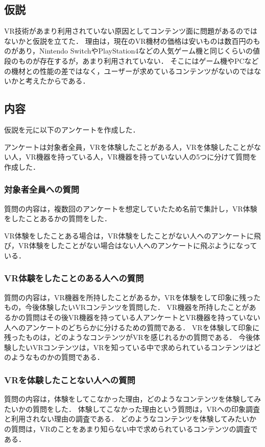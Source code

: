 \documentclass[12pt,a4j]{ltjsarticle}
\begin{document}
\subsection{仮説}
VR技術があまり利用されていない原因としてコンテンツ面に問題があるのではないかと仮説を立てた．
理由は，現在のVR機材の価格は安いものは数百円のものがあり，Nintendo SwitchやPlayStation4などの人気ゲーム機と同じくらいの値段のものが存在するが，あまり利用されていない．
そこにはゲーム機やPCなどの機材との性能の差ではなく，ユーザーが求めているコンテンツがないのではないかと考えたからである．

\subsection{内容}
仮説を元に以下のアンケートを作成した．

アンケートは対象者全員，VRを体験したことがある人，VRを体験したことがない人，VR機器を持っている人，VR機器を持っていない人の5つに分けて質問を作成した．

\subsubsection{対象者全員への質問}
質問の内容は，複数回のアンケートを想定していたため名前で集計し，VR体験をしたことあるかの質問をした．

VR体験をしたことある場合は，VR体験をしたことがない人へのアンケートに飛び，VR体験をしたことがない場合はない人へのアンケートに飛ぶようになっている．

\subsubsection{VR体験をしたことのある人への質問}
質問の内容は，VR機器を所持したことがあるか，VRを体験をして印象に残ったもの，今後体験したいVRコンテンツを質問した．
VR機器を所持したことがあるかの質問はその後VR機器を持っている人アンケートとVR機器を持っていない人へのアンケートのどちらかに分けるための質問である．
VRを体験して印象に残ったものは，どのようなコンテンツがVRを感じれるかの質問である．
今後体験したいVRコンテンツは，VRを知っている中で求められているコンテンツはどのようなものかの質問である．

\subsubsection{VRを体験したことない人への質問}
質問の内容は，体験をしてこなかった理由，どのようなコンテンツを体験してみたいかの質問をした．
体験してこなかった理由という質問は，VRへの印象調査と利用されない理由の調査である．
どのようなコンテンツを体験してみたいかの質問は，VRのことをあまり知らない中で求められているコンテンツの調査である．
\end{document}
